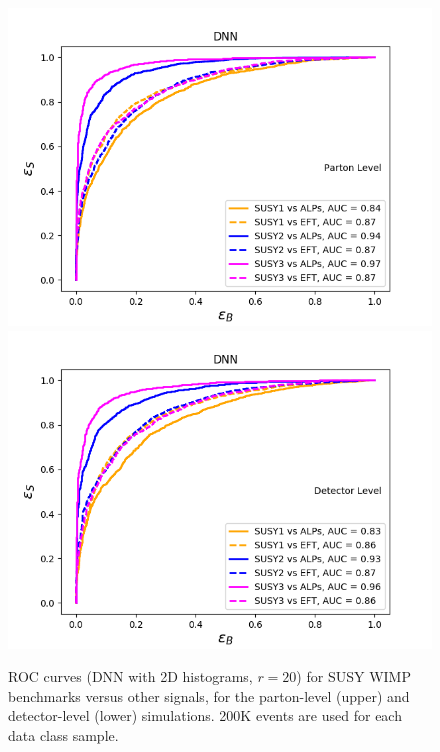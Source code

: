\documentclass[prd,aps,letterpaper,floatfix,superscriptaddress,preprintnumbers,twocolumn,10pt,nofootinbib]{revtex4-1}
\begin{document}
\begin{figure}%
\centering
\includegraphics[scale=0.50]{figures/2D_DNN_SUSY_vs_sig_LO_ROC.png}
\includegraphics[scale=0.50]{figures/2D_DNN_SUSY_vs_sig_delphes_ROC.png}
\caption{ROC curves (DNN with 2D histograms, $r = 20$) for SUSY WIMP benchmarks versus other signals, for the parton-level (upper) and detector-level (lower) simulations. 200K events are used for each data class sample.}\label{2D_DNN_SUSY_vs_sig_LO_ROC}
\end{figure}
\end{document}
